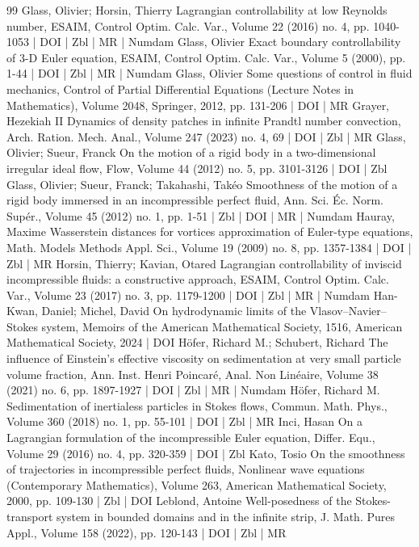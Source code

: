 \begin{thebibliography}{99}
 Glass, Olivier; Horsin, Thierry Lagrangian controllability at low Reynolds number, ESAIM, Control Optim. Calc. Var., Volume 22 (2016) no. 4, pp. 1040-1053 | DOI | Zbl | MR | Numdam
 Glass, Olivier Exact boundary controllability of 3-D Euler equation, ESAIM, Control Optim. Calc. Var., Volume 5 (2000), pp. 1-44 | DOI | Zbl | MR | Numdam
 Glass, Olivier Some questions of control in fluid mechanics, Control of Partial Differential Equations (Lecture Notes in Mathematics), Volume 2048, Springer, 2012, pp. 131-206 | DOI | MR
 Grayer, Hezekiah II Dynamics of density patches in infinite Prandtl number convection, Arch. Ration. Mech. Anal., Volume 247 (2023) no. 4, 69 | DOI | Zbl | MR
 Glass, Olivier; Sueur, Franck On the motion of a rigid body in a two-dimensional irregular ideal flow, Flow, Volume 44 (2012) no. 5, pp. 3101-3126 | DOI | Zbl
 Glass, Olivier; Sueur, Franck; Takahashi, Takéo Smoothness of the motion of a rigid body immersed in an incompressible perfect fluid, Ann. Sci. Éc. Norm. Supér., Volume 45 (2012) no. 1, pp. 1-51 | Zbl | DOI | MR | Numdam
 Hauray, Maxime Wasserstein distances for vortices approximation of Euler-type equations, Math. Models Methods Appl. Sci., Volume 19 (2009) no. 8, pp. 1357-1384 | DOI | Zbl | MR
 Horsin, Thierry; Kavian, Otared Lagrangian controllability of inviscid incompressible fluids: a constructive approach, ESAIM, Control Optim. Calc. Var., Volume 23 (2017) no. 3, pp. 1179-1200 | DOI | Zbl | MR | Numdam
 Han-Kwan, Daniel; Michel, David On hydrodynamic limits of the Vlasov–Navier–Stokes system, Memoirs of the American Mathematical Society, 1516, American Mathematical Society, 2024 | DOI
 Höfer, Richard M.; Schubert, Richard The influence of Einstein’s effective viscosity on sedimentation at very small particle volume fraction, Ann. Inst. Henri Poincaré, Anal. Non Linéaire, Volume 38 (2021) no. 6, pp. 1897-1927 | DOI | Zbl | MR | Numdam
 Höfer, Richard M. Sedimentation of inertialess particles in Stokes flows, Commun. Math. Phys., Volume 360 (2018) no. 1, pp. 55-101 | DOI | Zbl | MR
 Inci, Hasan On a Lagrangian formulation of the incompressible Euler equation, Differ. Equ., Volume 29 (2016) no. 4, pp. 320-359 | DOI | Zbl
 Kato, Tosio On the smoothness of trajectories in incompressible perfect fluids, Nonlinear wave equations (Contemporary Mathematics), Volume 263, American Mathematical Society, 2000, pp. 109-130 | Zbl | DOI
 Leblond, Antoine Well-posedness of the Stokes-transport system in bounded domains and in the infinite strip, J. Math. Pures Appl., Volume 158 (2022), pp. 120-143 | DOI | Zbl | MR

\end{thebibliography}
